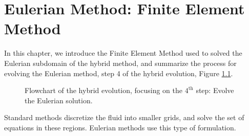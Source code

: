 \chapter{Eulerian Method: Finite Element Method}
\label{ch:eulerian}

%	


In this chapter, we introduce the Finite Element Method used to solved the Eulerian subdomain of the hybrid method, and summarize the process for evolving the Eulerian method, step 4 of the hybrid evolution, Figure \ref{fig:flowchart_simpleCoupling_Eulerian}.

	\begin{figure}[!h]
		\centering
		\caption{Flowchart of the hybrid evolution, focusing on the $4^{\mathrm{th}}$ step: Evolve the Eulerian solution.}
		\label{fig:flowchart_simpleCoupling_Eulerian}
	\end{figure}

Standard  methods discretize the fluid into smaller grids, and solve the set of  equations in these regions. Eulerian methods use this type of formulation.

